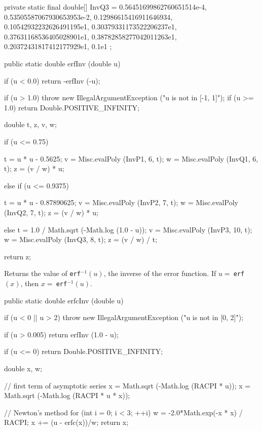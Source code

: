 \begin{code}
\begin{hide}
    private static final double[] InvQ3 = {
        0.56451699862760651514e-4,
        0.53505587067930653953e-2,
        0.12986615416911646934,
        0.10542932232626491195e1,
        0.30379331173522206237e1,
        0.37631168536405028901e1,
        0.38782858277042011263e1,
        0.20372431817412177929e1,
        0.1e1
    };\end{hide}

   public static double erfInv (double u) \begin{hide} {
      if (u < 0.0)
         return -erfInv (-u);

      if (u > 1.0)
         throw new IllegalArgumentException ("u is not in [-1, 1]");
      if (u >= 1.0)
         return Double.POSITIVE_INFINITY;

      double t, z, v, w;

      if (u <= 0.75) {
         t = u * u - 0.5625;
         v = Misc.evalPoly (InvP1, 6, t);
         w = Misc.evalPoly (InvQ1, 6, t);
         z = (v / w) * u;

      } else if (u <= 0.9375) {
         t = u * u - 0.87890625;
         v = Misc.evalPoly (InvP2, 7, t);
         w = Misc.evalPoly (InvQ2, 7, t);
         z = (v / w) * u;

      } else {
         t = 1.0 / Math.sqrt (-Math.log (1.0 - u));
         v = Misc.evalPoly (InvP3, 10, t);
         w = Misc.evalPoly (InvQ3, 8, t);
         z = (v / w) / t;
      }

      return z;
   }\end{hide}
\end{code}
\begin{tabb}
Returns the value of \texttt{erf}${}^{-1}(u)$, the inverse of the error
function. If $u =\ $\texttt{erf}$(x)$, then $x =\ $\texttt{erf}${}^{-1}(u)$.
\end{tabb}
\begin{htmlonly}
\end{htmlonly}
\begin{code}

   public static double erfcInv (double u)\begin{hide} {
      if (u < 0 || u > 2)
         throw new IllegalArgumentException ("u is not in [0, 2]");

      if (u > 0.005)
         return erfInv (1.0 - u);

      if (u <= 0)
         return Double.POSITIVE_INFINITY;

      double x, w;

      // first term of asymptotic series
      x = Math.sqrt (-Math.log (RACPI * u));
      x = Math.sqrt (-Math.log (RACPI * u * x));

      // Newton's method
      for (int i = 0; i < 3; ++i) {
         w = -2.0*Math.exp(-x * x) / RACPI;
         x += (u - erfc(x))/w;
      }
      return x;
   }\end{hide}
\end{code}

